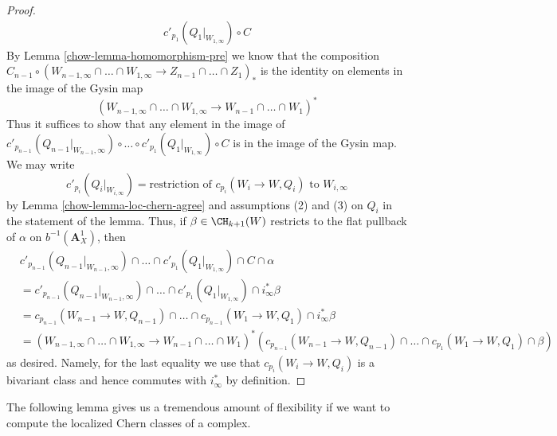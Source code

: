 \begin{proof}
\begin{align*}
c'_{p_1}(Q_1|_{W_{1, \infty}})
\circ C
\end{align*}
By Lemma \ref{chow-lemma-homomorphism-pre}
we know that the composition
$C_{n - 1} \circ (W_{n - 1, \infty} \cap \ldots \cap W_{1, \infty} \to
Z_{n - 1} \cap \ldots \cap Z_1)_*$
is the identity on elements in the image of the Gysin map
$$
(W_{n - 1, \infty} \cap \ldots \cap W_{1, \infty} \to
W_{n - 1} \cap \ldots \cap W_1)^*
$$
Thus it suffices to show that any element in the image of
$c'_{p_{n - 1}}(Q_{n - 1}|_{W_{n - 1}, \infty}) \circ \ldots \circ
c'_{p_1}(Q_1|_{W_{1, \infty}}) \circ C$
is in the image of the Gysin map. We may write
$$
c'_{p_i}(Q_i|_{W_{i, \infty}}) = \text{restriction of } c_{p_i}(W_i \to W, Q_i)
\text{ to } W_{i, \infty}
$$
by Lemma \ref{chow-lemma-loc-chern-agree} and assumptions (2) and (3) on $Q_i$
in the statement of the lemma. Thus, if $\beta \in \CH_{k + 1}(W)$
restricts to the flat pullback of $\alpha$ on $b^{-1}(\mathbf{A}^1_X)$,
then
\begin{align*}
& c'_{p_{n - 1}}(Q_{n - 1}|_{W_{n - 1}, \infty}) \cap \ldots \cap
c'_{p_1}(Q_1|_{W_{1, \infty}})
\cap C \cap \alpha \\
& =
c'_{p_{n - 1}}(Q_{n - 1}|_{W_{n - 1}, \infty}) \cap \ldots \cap
c'_{p_1}(Q_1|_{W_{1, \infty}})
\cap i_\infty^* \beta \\
& =
c_{p_{n - 1}}(W_{n - 1} \to W, Q_{n - 1}) \cap \ldots \cap
c_{p_{n - 1}}(W_1 \to W, Q_1) \cap i_\infty^* \beta \\
& =
(W_{n - 1, \infty} \cap \ldots \cap W_{1, \infty} \to
W_{n - 1} \cap \ldots \cap W_1)^*
\left(c_{p_{n - 1}}(W_{n - 1} \to W, Q_{n - 1}) \cap \ldots \cap
c_{p_1}(W_1 \to W, Q_1) \cap \beta\right)
\end{align*}
as desired. Namely, for the last equality we use that
$c_{p_i}(W_i \to W, Q_i)$ is a bivariant class and hence
commutes with $i_\infty^*$ by definition.
\end{proof}

The following lemma gives us a tremendous amount of flexibility
if we want to compute the localized Chern classes of a complex.

